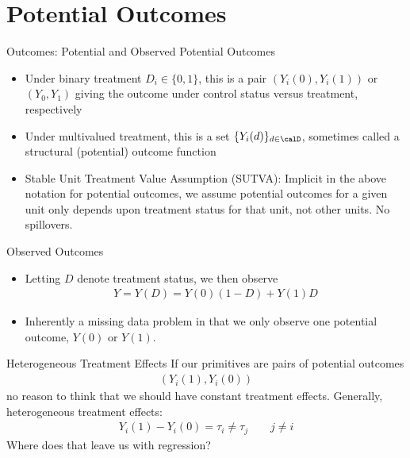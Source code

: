 \documentclass[aspectratio=169, handout]{beamer}
\begin{document}
\section{Potential Outcomes}

{\footnotesize
\begin{frame}{Outcomes: Potential and Observed}
\alert{Potential Outcomes}
\begin{itemize}
  \item Under \alert{binary} treatment $D_i\in\{0,1\}$, this is a pair
    $(Y_i(0),Y_i(1))$ or $(Y_0,Y_1)$ giving the outcome under control
    status versus treatment, respectively
  \pause
  \item Under \alert{multivalued} treatment, this is a set
    $\{Y_i(d)\}_{d\in \calD}$,
    sometimes called a \alert{structural (potential) outcome function}
  \pause
  \item \alert{Stable Unit Treatment Value Assumption (SUTVA)}:
    Implicit in the above notation for potential outcomes, we assume
    potential outcomes for a given unit only depends upon treatment status
    \alert{for that unit}, not other units.
    \alert{No spillovers}.
\end{itemize}
\alert{Observed Outcomes}
\begin{itemize}
  \item Letting $D$ denote treatment status, we then observe
    \begin{align*}
      Y
      = Y(D)
      =
      Y(0)(1-D)
      +
      Y(1)D
    \end{align*}
  \item Inherently a \alert{missing data problem} in that we only
    observe one potential outcome, $Y(0)$ or $Y(1)$.
\end{itemize}
\end{frame}
}


{\footnotesize
\begin{frame}{Heterogeneous Treatment Effects}
If our primitives are pairs of potential outcomes
\begin{align*}
  (Y_i(1),Y_i(0))
\end{align*}
no reason to think that we should have constant treatment effects.
Generally, \alert{heterogeneous treatment effects}:
\begin{align*}
  Y_i(1)-Y_i(0)=\tau_i\neq \tau_j \qquad
  j\neq i
\end{align*}
Where does that leave us with \alert{regression}?
\end{frame}
}
\end{document}

